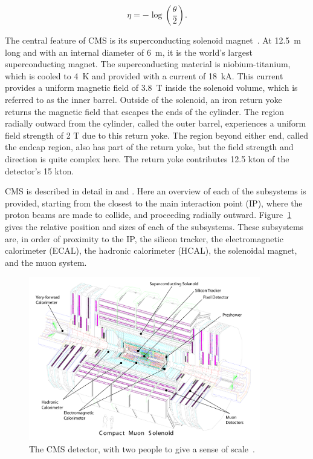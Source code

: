 \begin{equation}
\eta = -\log\left(\frac{\theta}{2}\right) .
\end{equation}

The central feature of CMS is its superconducting solenoid magnet~\cite{cms:solenoid}.
At 12.5~m long and with an internal diameter of 6~m, it is the world's largest superconducting magnet.
The superconducting material is niobium-titanium, which is cooled to 4~K and provided with a current
of 18~kA.
This current provides a uniform magnetic field of 3.8~T inside the solenoid volume, which is referred
to as the inner barrel.
Outside of the solenoid, an iron return yoke returns the magnetic field that escapes the ends
of the cylinder. The region radially outward from the cylinder, called the outer barrel, experiences
a uniform field strength of 2 T due to this return yoke. The region beyond either end, called
the endcap region, also has part of the return yoke, but the field strength
and direction is quite complex here. The return yoke contributes 12.5 kton of the detector's 15 kton.

CMS is described in detail in \cite{Chatrchyan:2008zzk} and \cite{Bayatian:922757}.
Here an overview of each of the subsystems
is provided, starting from the closest to the main interaction point (IP), where the proton beams
are made to collide, and proceeding
radially outward. Figure~\ref{fig:CMS_side} gives the relative position and sizes of each of the
subsystems. These subsystems are, in order of proximity to the IP, the silicon tracker,
the electromagnetic calorimeter (ECAL), the hadronic calorimeter (HCAL),
the solenoidal magnet, and the muon system.

\begin{figure}[htbp!]
 \begin{center}
   \includegraphics[width=0.90\textwidth]{figures/experiment/cms_complete_labelled.pdf}
      \end{center}
\caption{The CMS detector, with two people to give a sense of scale~\cite{Collaboration:1433717}.}
\label{fig:CMS_side}
\end{figure}

